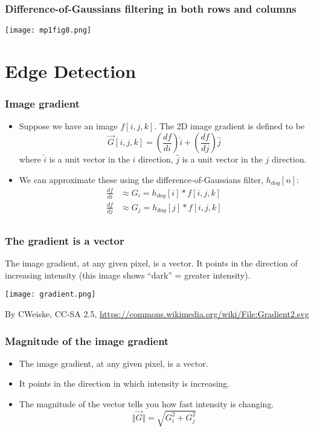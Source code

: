 \documentclass{beamer}
\begin{document}
\begin{frame}
  \frametitle{Difference-of-Gaussians filtering in both rows and columns}
      
  \centerline{\texttt{[image: mp1fig8.png]}}
\end{frame}

\section[Edges]{Edge Detection}
\setcounter{subsection}{1}

\begin{frame}
  \frametitle{Image gradient}
  \begin{itemize}
  \item Suppose we have an image $f[i,j,k]$.  The 2D image gradient is
    defined to be
    \[
    \vec{G}[i,j,k] = \left(\frac{df}{di}\right)\hat{i} + \left(\frac{df}{dj}\right)\hat{j}
    \]
    where $\hat{i}$ is a unit vector in the $i$ direction, $\hat{j}$
    is a unit vector in the $j$ direction.
  \item We can approximate these using the difference-of-Gaussians filter, $h_{dog}[n]$:
    \begin{align*}
      \frac{df}{di} &\approx G_i = h_{dog}[i]\ast f[i,j,k]\\
      \frac{df}{dj} &\approx G_j = h_{dog}[j]\ast f[i,j,k]\\
    \end{align*}
  \end{itemize}
\end{frame}
\begin{frame}
  \frametitle{The gradient is a vector}
  The image gradient, at any given pixel, is a vector.  It  points in the direction of
  increasing intensity (this image shows ``dark'' = greater intensity).
  \centerline{\texttt{[image: gradient.png]}}
  \begin{tiny}
    By CWeiske, CC-SA 2.5,
    \url{https://commons.wikimedia.org/wiki/File:Gradient2.svg}
  \end{tiny}
\end{frame}
      
\begin{frame}
  \frametitle{Magnitude of the image gradient}
  \begin{itemize}
  \item
    The image gradient, at any given pixel, is a vector.
  \item
    It points in the direction in which intensity is increasing.
  \item
    The magnitude of the vector tells you how fast intensity is
    changing.
    \[
    \Vert \vec{G}\Vert =\sqrt{G_i^2 + G_j^2}
    \]
  \end{itemize}
\end{frame}
    
\end{document}
